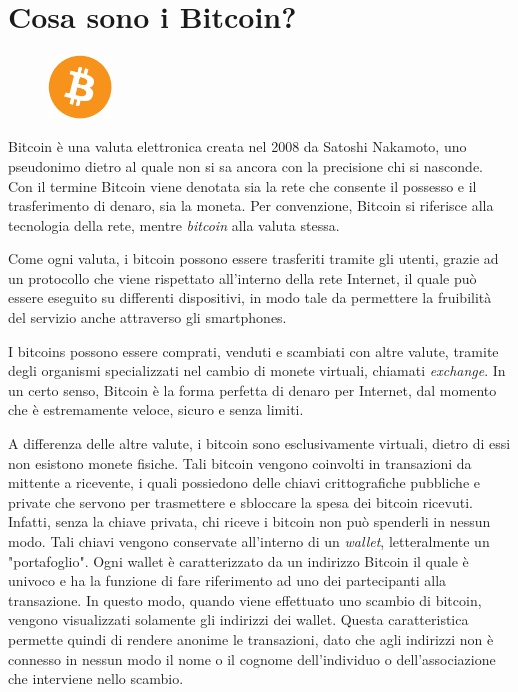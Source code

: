 \section{Cosa sono i Bitcoin?}

\begin{figure}
	\vspace{-20pt}
	\includegraphics[width=0.15\textwidth]{figure/btcicon}
\end{figure}

Bitcoin è una valuta elettronica creata nel 2008 da Satoshi Nakamoto, uno pseudonimo dietro al quale non si sa ancora con la precisione chi si nasconde.
Con il termine Bitcoin viene denotata sia la rete che consente il possesso e il trasferimento di denaro, sia la moneta. Per convenzione, Bitcoin si riferisce alla tecnologia della rete, mentre \textit{bitcoin} alla valuta stessa.\cite{wiki:bitcoin}

Come ogni valuta, i bitcoin possono essere trasferiti tramite gli utenti, grazie ad un protocollo che viene rispettato all'interno della rete Internet, il quale può essere eseguito su differenti dispositivi, in modo tale da permettere la fruibilità del servizio anche attraverso gli smartphones.
 
I bitcoins possono essere comprati, venduti e scambiati con altre valute, tramite degli organismi specializzati nel cambio di monete virtuali, chiamati \textit{exchange}. In un certo senso, Bitcoin è la forma perfetta di denaro per Internet, dal momento che è estremamente veloce, sicuro e senza limiti.

A differenza delle altre valute, i bitcoin sono esclusivamente virtuali, dietro di essi non esistono monete fisiche. Tali bitcoin vengono coinvolti in transazioni da mittente a ricevente, i quali possiedono delle chiavi crittografiche pubbliche e private che servono per trasmettere e sbloccare la spesa dei bitcoin ricevuti.
Infatti, senza la chiave privata, chi riceve i bitcoin non può spenderli in nessun modo. Tali chiavi vengono conservate all'interno di un \textit{wallet}, letteralmente un "portafoglio". Ogni wallet è caratterizzato da un indirizzo Bitcoin il quale è univoco e ha la funzione di fare riferimento ad uno dei partecipanti alla transazione. In questo modo, quando viene effettuato uno scambio di bitcoin, vengono visualizzati solamente gli indirizzi dei wallet. Questa caratteristica permette quindi di rendere anonime le transazioni, dato che agli indirizzi non è connesso in nessun modo il nome o il cognome dell'individuo o dell'associazione che interviene nello scambio.

